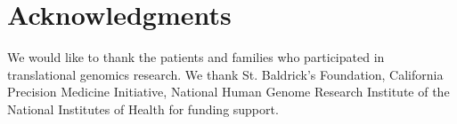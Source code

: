 \documentclass[10pt,letterpaper]{article}
\begin{document}
\section*{Acknowledgments}
We would like to thank the patients and families who participated in translational genomics research. We thank St. Baldrick's Foundation, California Precision Medicine Initiative, National Human Genome Research Institute of the National Institutes of Health for funding support.

\nolinenumbers

%
%
% 




\begin{thebibliography}{10}
\end{thebibliography}
\end{document}
